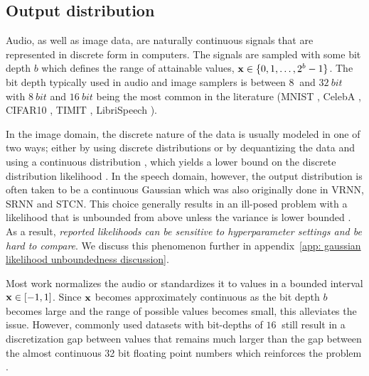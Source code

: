 {\subsection{Output distribution}
Audio, as well as image data, are naturally continuous signals that are represented in discrete form in computers. The signals are sampled with some bit depth $b$ which defines the range of attainable values, ${\mathbf{x}}\in\{0,1,\dots,2^b-1\}$. The bit depth typically used in audio and image samplers is between $\SI{8}{}$ and $\SI{32}{bit}$ with $\SI{8}{bit}$ and $\SI{16}{bit}$ being the most common in the literature (MNIST \parencite{lecun_gradientbased_1998}, CelebA \parencite{liu_deep_2015}, CIFAR10 \parencite{krizhevsky_learning_2009}, TIMIT \parencite{garofolo_timit_1993}, LibriSpeech \parencite{panayotov_librispeech_2015}).

In the image domain, the discrete nature of the data is usually modeled in one of two ways; either by using discrete distributions \parencite{salimans_pixelcnn_2017, maaloe_biva_2019, child_very_2021} or by dequantizing the data and using a continuous distribution \parencite{dinh_nice_2015, sonderby_ladder_2016, ho_flow_2019}, which yields a lower bound on the discrete distribution likelihood \parencite{theis_note_2016}. 
In the speech domain, however, the output distribution is often taken to be a continuous Gaussian \parencite{hsu_unsupervised_2017,lai_stochastic_2018,zhu_s3vae_2020} which was also originally done in VRNN, SRNN and STCN. 
This choice generally results in an ill-posed problem with a likelihood that is unbounded from above unless the variance is lower bounded \parencite{mattei_leveraging_2018}. As a result, \emph{reported likelihoods can be sensitive to hyperparameter settings and be hard to compare}. We discuss this phenomenon further in appendix~\cref{app: gaussian likelihood unboundedness discussion}.

Most work normalizes the audio or standardizes it to values in a bounded interval ${\mathbf{x}}\in[-1,1]$. Since ${\mathbf{x}}$ becomes approximately continuous as the bit depth $b$ becomes large and the range of possible values becomes small, this alleviates the issue. However, commonly used datasets with bit-depths of $\SI{16}{}$ still result in a discretization gap between values that remains much larger than the gap between the almost continuous 32 bit floating point numbers which reinforces the problem \parencite{bishop_pattern_2006}.

}
